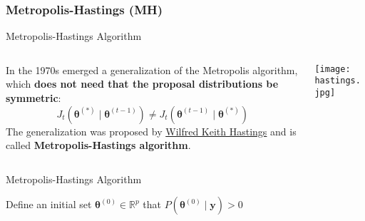 \subsubsection{Metropolis-Hastings (MH)}
\begin{frame}{Metropolis-Hastings Algorithm}
	\begin{columns}
		\begin{column}{0.8\textwidth}
			In the 1970s emerged a generalization of the Metropolis algorithm,
			which \textbf{does not need that the proposal distributions be symmetric}:
			$$
				J_t (\boldsymbol{\theta}^{(*)} \mid \boldsymbol{\theta}^{(t-1)}) \neq J_t(\boldsymbol{\theta}^{(t-1)} \mid \boldsymbol{\theta}^{(*)})
			$$
			The generalization was proposed by \href{https://en.wikipedia.org/wiki/W._K._Hastings}{Wilfred Keith Hastings}
			\parencite{hastingsMonteCarloSampling1970} and is called \textbf{Metropolis-Hastings algorithm}.
		\end{column}
		\begin{column}{0.2\textwidth}
			\centering
			\texttt{[image: hastings.jpg]}
		\end{column}
	\end{columns}
\end{frame}

\begin{frame}{Metropolis-Hastings Algorithm}
	\SetAlCapFnt{\normalsize}
	\SetAlCapNameFnt{\normalsize}
	\small
	\begin{algorithm}[H]
		\DontPrintSemicolon
		\SetAlgoNoEnd
		\SetAlgoLined
		Define an initial set $\boldsymbol{\theta}^{(0)} \in \mathbb{R}^p$ that $P\left(\boldsymbol{\theta}^{(0)} \mid \mathbf{y} \right) > 0$\;
		\caption{Metropolis-Hastings}
	\end{algorithm}
\end{frame}

